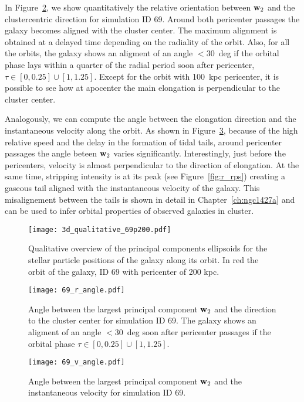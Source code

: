 In Figure~\ref{fig:pca_angle_r}, we show quantitatively the relative orientation between $\boldsymbol{\mathbf{w}}_2$ and the clustercentric direction for simulation ID 69.
Around both pericenter passages the galaxy becomes aligned with the cluster center.
The maximum alignment is obtained at a delayed time depending on the radiality of the orbit.
Also, for all the orbits, the galaxy shows an aligment of an angle $<30$~deg if the orbital phase lays within a quarter of the radial period soon after pericenter, \ie{} $\tau \in [0, 0.25] \cup{} [1, 1.25]$.
Except for the orbit with 100~kpc pericenter, it is possible to see how at apocenter the main elongation is perpendicular to the cluster center. %

Analogously, we can compute the angle between the elongation direction and the instantaneous velocity along the orbit.
As shown in Figure~\ref{fig:pca_angle_v}, because of the high relative speed and the delay in the formation of tidal tails, around pericenter passages the angle beteen $\boldsymbol{\mathbf{w}}_2$ varies significantly.
Interestingly, just before the pericenters, velocity is almost perpendicular to the direction of elongation.
At the same time, stripping intensity is at its peak (see Figure~\ref{fig:r_rps}) creating a gaseous tail aligned with the instantaneous velocity of the galaxy.
This misalignement between the tails is shown in detail in Chapter~\ref{ch:ngc1427a} and can be used to infer orbital properties of observed galaxies in cluster.

\begin{figure}
\centering
\texttt{[image: 3d\_qualitative\_69p200.pdf]}
\caption{Qualitative overview of the principal components ellipsoids for the stellar particle positions of the galaxy along its orbit.
In red the orbit of the galaxy, ID 69 with pericenter of 200 kpc.}
\label{fig:pca}
\end{figure}

\begin{figure}
\centering
\texttt{[image: 69\_r\_angle.pdf]}
\caption{Angle between the largest principal component $\boldsymbol{\mathbf{w}}_2$ and the direction to the cluster center for simulation ID 69. The galaxy shows an aligment of an angle $<30$~deg soon after pericenter passages \ie{} if the orbital phase $\tau \in [0, 0.25] \cup{} [1, 1.25]$.}
\label{fig:pca_angle_r}
\end{figure}
\begin{figure}
\centering
\texttt{[image: 69\_v\_angle.pdf]}
\caption{Angle between the largest principal component $\boldsymbol{\mathbf{w}}_2$ and the instantaneous velocity for simulation ID 69.}
\label{fig:pca_angle_v}
\end{figure}

